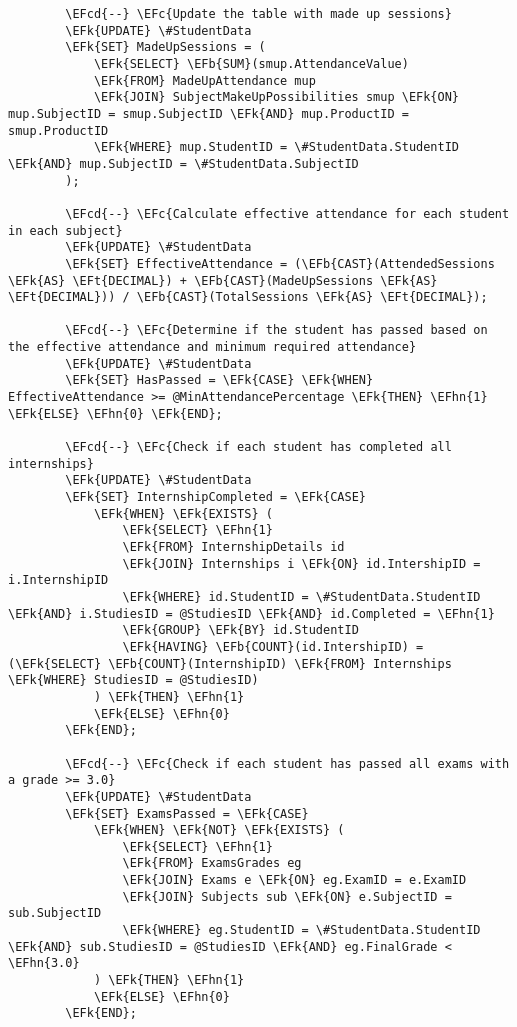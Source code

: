 \documentclass[11pt]{article}
\newcommand{\EFc}[1]{\textcolor{EFc}{\textit{#1}}} %
\newcommand{\EFcd}[1]{\textcolor{EFcd}{\textit{#1}}} %
\newcommand{\EFk}[1]{\textcolor{EFk}{\textbf{#1}}} %
\newcommand{\EFb}[1]{\textcolor{EFb}{\textbf{#1}}} %
\newcommand{\EFt}[1]{\textcolor{EFt}{\textbf{#1}}} %
\newcommand{\EFhn}[1]{\textcolor{EFhn}{#1}} %
\begin{document}
\begin{Code}
\begin{Verbatim}
        \EFcd{--} \EFc{Update the table with made up sessions}
        \EFk{UPDATE} \#StudentData
        \EFk{SET} MadeUpSessions = (
            \EFk{SELECT} \EFb{SUM}(smup.AttendanceValue)
            \EFk{FROM} MadeUpAttendance mup
            \EFk{JOIN} SubjectMakeUpPossibilities smup \EFk{ON} mup.SubjectID = smup.SubjectID \EFk{AND} mup.ProductID = smup.ProductID
            \EFk{WHERE} mup.StudentID = \#StudentData.StudentID \EFk{AND} mup.SubjectID = \#StudentData.SubjectID
        );

        \EFcd{--} \EFc{Calculate effective attendance for each student in each subject}
        \EFk{UPDATE} \#StudentData
        \EFk{SET} EffectiveAttendance = (\EFb{CAST}(AttendedSessions \EFk{AS} \EFt{DECIMAL}) + \EFb{CAST}(MadeUpSessions \EFk{AS} \EFt{DECIMAL})) / \EFb{CAST}(TotalSessions \EFk{AS} \EFt{DECIMAL});

        \EFcd{--} \EFc{Determine if the student has passed based on the effective attendance and minimum required attendance}
        \EFk{UPDATE} \#StudentData
        \EFk{SET} HasPassed = \EFk{CASE} \EFk{WHEN} EffectiveAttendance >= @MinAttendancePercentage \EFk{THEN} \EFhn{1} \EFk{ELSE} \EFhn{0} \EFk{END};

        \EFcd{--} \EFc{Check if each student has completed all internships}
        \EFk{UPDATE} \#StudentData
        \EFk{SET} InternshipCompleted = \EFk{CASE} 
            \EFk{WHEN} \EFk{EXISTS} (
                \EFk{SELECT} \EFhn{1}
                \EFk{FROM} InternshipDetails id
                \EFk{JOIN} Internships i \EFk{ON} id.IntershipID = i.InternshipID
                \EFk{WHERE} id.StudentID = \#StudentData.StudentID \EFk{AND} i.StudiesID = @StudiesID \EFk{AND} id.Completed = \EFhn{1}
                \EFk{GROUP} \EFk{BY} id.StudentID
                \EFk{HAVING} \EFb{COUNT}(id.IntershipID) = (\EFk{SELECT} \EFb{COUNT}(InternshipID) \EFk{FROM} Internships \EFk{WHERE} StudiesID = @StudiesID)
            ) \EFk{THEN} \EFhn{1}
            \EFk{ELSE} \EFhn{0}
        \EFk{END};

        \EFcd{--} \EFc{Check if each student has passed all exams with a grade >= 3.0}
        \EFk{UPDATE} \#StudentData
        \EFk{SET} ExamsPassed = \EFk{CASE} 
            \EFk{WHEN} \EFk{NOT} \EFk{EXISTS} (
                \EFk{SELECT} \EFhn{1}
                \EFk{FROM} ExamsGrades eg
                \EFk{JOIN} Exams e \EFk{ON} eg.ExamID = e.ExamID
                \EFk{JOIN} Subjects sub \EFk{ON} e.SubjectID = sub.SubjectID
                \EFk{WHERE} eg.StudentID = \#StudentData.StudentID \EFk{AND} sub.StudiesID = @StudiesID \EFk{AND} eg.FinalGrade < \EFhn{3.0}
            ) \EFk{THEN} \EFhn{1}
            \EFk{ELSE} \EFhn{0}
        \EFk{END};


\end{Verbatim}
\end{Code}
\end{document}
